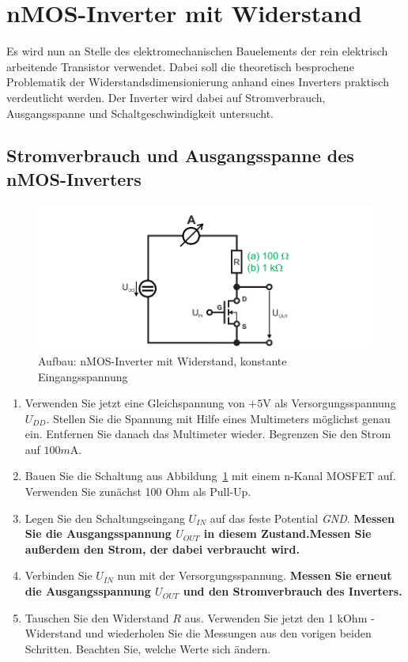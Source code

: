 \documentclass[10pt]{scrreprt}
\begin{document}
    \section{nMOS-Inverter mit Widerstand}
    Es wird nun an Stelle des elektromechanischen Bauelements der rein elektrisch
    arbeitende Transistor verwendet. Dabei soll die theoretisch besprochene Problematik der
    Widerstandsdimensionierung anhand eines Inverters praktisch verdeutlicht werden. Der Inverter
    wird dabei auf Stromverbrauch, Ausgangsspanne und Schaltgeschwindigkeit untersucht.

    \subsection{Stromverbrauch und Ausgangsspanne des nMOS-Inverters}
    \begin{figure}[H]
        \includegraphics[width=\textwidth]{abb13.png}
        \caption{Aufbau: nMOS-Inverter mit Widerstand, konstante Eingangsspannung}
        \label{fig:abb13}
    \end{figure}

    \begin{enumerate}
        \item Verwenden Sie jetzt eine Gleichspannung von $+5\si{\volt}$ als Versorgungsspannung $U_{DD}$.
            Stellen Sie die Spannung mit Hilfe eines Multimeters möglichst genau ein. Entfernen
            Sie danach das Multimeter wieder. Begrenzen Sie den Strom auf $100\si{m\ampere}$.
        \item Bauen Sie die Schaltung aus Abbildung~\ref{fig:abb13} mit einem n-Kanal MOSFET auf.
            Verwenden Sie zunächst 100 Ohm als Pull-Up.
        \item Legen Sie den Schaltungseingang $U_{IN}$ auf das feste Potential \textit{GND}.
            \textbf{Messen Sie  die Ausgangsspannung $U_{OUT}$ in diesem Zustand.Messen Sie außerdem
            den Strom, der dabei verbraucht wird.}
        \item Verbinden Sie $U_{IN}$ nun mit der Versorgungsspannung. \textbf{Messen Sie erneut die
            Ausgangsspannung $U_{OUT}$ und den Stromverbrauch des Inverters.}
        \item Tauschen Sie den Widerstand $R$ aus. Verwenden Sie jetzt den 1 kOhm - Widerstand
            und wiederholen Sie die Messungen aus den vorigen beiden Schritten.
            Beachten Sie, welche Werte sich ändern.
    \end{enumerate}
\end{document}

